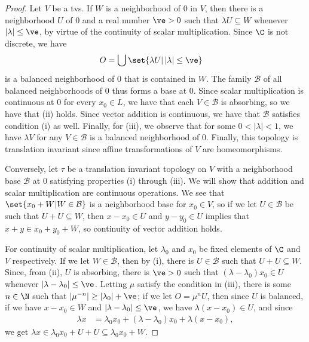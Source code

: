 \documentclass[10pt]{mypackage}
\begin{document}
\begin{proof}
  Let $V$ be a tvs. If $W$ is a neighborhood of $0$ in $V$, then there is a neighborhood $U$ of $0$ and a real number $\ve > 0$ such that $\lambda U \subseteq W$ whenever $\left\vert \lambda \right\vert\leq \ve$, by virtue of the continuity of scalar multiplication. Since $\C$ is not discrete, we have
  \begin{align*}
    O &= \bigcup\set{\lambda U | \left\vert \lambda \right\vert\leq \ve}
  \end{align*}
  is a balanced neighborhood of $0$ that is contained in $W$. The family $\mathcal{B}$ of all balanced neighborhoods of $0$ thus forms a base at $0$. Since scalar multiplication is continuous at $0$ for every $x_0\in L$, we have that each $V\in \mathcal{B}$ is absorbing, so we have that (ii) holds. Since vector addition is continuous, we have that $\mathcal{B}$ satisfies condition (i) as well. Finally, for (iii), we observe that for some $0 < \left\vert \lambda \right\vert < 1$, we have $\lambda V$ for any $V\in \mathcal{B}$ is a balanced neighborhood of $0$. Finally, this topology is translation invariant since affine transformations of $V$ are homeomorphisms.

  Conversely, let $\tau$ be a translation invariant topology on $V$ with a neighborhood base $\mathcal{B}$ at $0$ satisfying properties (i) through (iii). We will show that addition and scalar multiplication are continuous operations. We see that $\set{x_0 + W | W\in \mathcal{B}}$ is a neighborhood base for $x_0\in V$, so if we let $U\in \mathcal{B}$ be such that $U + U \subseteq W$, then $x-x_0\in U$ and $y-y_0\in U$ implies that $x + y\in x_0 + y_0 + W$, so continuity of vector addition holds.

  For continuity of scalar multiplication, let $\lambda_0$ and $x_0$ be fixed elements of $\C$ and $V$ respectively. If we let $W\in \mathcal{B}$, then by (i), there is $U\in \mathcal{B}$ such that $U + U \subseteq W$. Since, from (ii), $U$ is absorbing, there is $\ve > 0$ such that $\left( \lambda-\lambda_0 \right)x_0\in U$ whenever $\left\vert \lambda-\lambda_0 \right\vert \leq \ve$. Letting $\mu$ satisfy the condition in (iii), there is some $n\in \N$ such that $\left\vert \mu^{-n} \right\vert \geq \left\vert \lambda_0 \right\vert + \ve$; if we let $O = \mu^{n}U$, then since $U$ is balanced, if we have $x-x_0\in W$ and $\left\vert \lambda-\lambda_0 \right\vert \leq \ve$, we have $\lambda\left( x-x_0 \right) \in U$, and since
  \begin{align*}
    \lambda x &= \lambda_0x_0 + \left( \lambda-\lambda_0 \right)x_0 + \lambda\left( x-x_0 \right),
  \end{align*}
  we get $\lambda x \in \lambda_0 x_0 + U + U \subseteq \lambda_0x_0 + W$.
\end{proof}
\end{document}
